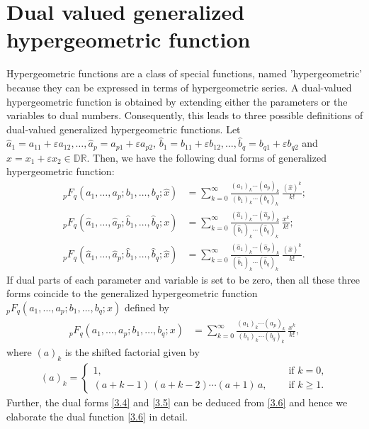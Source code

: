 \documentclass[11pt,a4paper,fleqn]{article}
\numberwithin{equation}{section}
\numberwithin{lemma}{section}
\numberwithin{theorem}{section}
\numberwithin{corollary}{section}
\begin{document}
\section{Dual valued generalized hypergeometric function}
Hypergeometric functions are a class of special functions, named 'hypergeometric' because they can be expressed in terms of hypergeometric series. A dual-valued hypergeometric function is obtained by extending either the parameters or the variables to dual numbers. Consequently, this leads to three possible definitions of dual-valued generalized hypergeometric functions. Let $\widehat{a}_1 = a_{11} + \varepsilon a_{12}, \dots, \widehat{a}_p = a_{p1} + \varepsilon a_{p2}$, $\widehat{b}_1 = b_{11} + \varepsilon b_{12}, \dots, \widehat{b}_q = b_{q1} + \varepsilon b_{q2}$ and $\widehat{x} = x_1 + \varepsilon x_2 \in \mathbb{D}\mathbb{R}$. Then, we have the following dual forms of generalized hypergeometric function: 
\begin{align}
	{}_pF_q (a_1, \dots, a_p; b_1, \dots, b_q; \widehat{x}) & = \sum_{k = 0}^{\infty} \frac{(a_1)_k \cdots (a_p)_k}{(b_1)_k \cdots (b_q)_k} \, \frac{(\widehat{x})^k}{k!};\label{3.4}
	\\[5pt]
	{}_pF_q (\widehat{a}_1, \dots, \widehat{a}_p; \widehat{b}_1, \dots, \widehat{b}_q;  {x}) & = \sum_{k = 0}^{\infty} \frac{(\widehat{a}_1)_k \cdots (\widehat{a}_p)_k}{(\widehat{b}_1)_k \cdots (\widehat{b}_q)_k} \, \frac{ {x}^k}{k!};\label{3.5}
	\\[5pt]
		{}_pF_q (\widehat{a}_1, \dots, \widehat{a}_p; \widehat{b}_1, \dots, \widehat{b}_q;  \widehat{x}) & = \sum_{k = 0}^{\infty} \frac{(\widehat{a}_1)_k \cdots (\widehat{a}_p)_k}{(\widehat{b}_1)_k \cdots (\widehat{b}_q)_k} \, \frac{ (\widehat{x})^k}{k!}.\label{3.6}
\end{align} 
If dual parts of each parameter and variable is set to be zero, then all these three forms coincide to the generalized hypergeometric function ${}_pF_q (a_1, \dots, a_p; b_1, \dots, b_q;  {x})$ defined by
\begin{align}
	{}_pF_q (a_1, \dots, a_p; b_1, \dots, b_q;  {x}) & = \sum_{k = 0}^{\infty} \frac{(a_1)_k \cdots (a_p)_k}{(b_1)_k \cdots (b_q)_k} \, \frac{ {x}^k}{k!},
\end{align}
where $(a)_k$ is the shifted factorial given by
\begin{align}
	(a)_k =   \begin{cases}
		1, \quad & \text{ if } k = 0,\\
		(a + k - 1) \, (a + k - 2) \cdots (a + 1)  \, a, \quad & \text{ if } k \ge 1.
	\end{cases}
\end{align}
 Further, the dual forms \eqref{3.4} and \eqref{3.5} can be deduced from \eqref{3.6} and hence we elaborate the dual function \eqref{3.6} in detail. 
\end{document}
